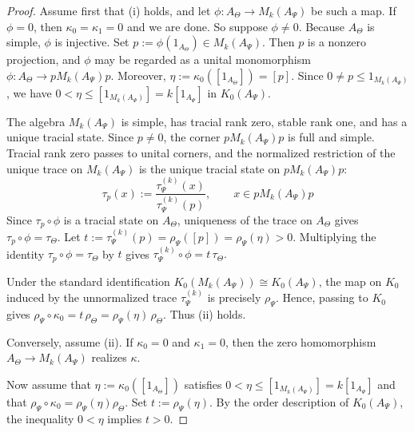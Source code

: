 \documentclass[11pt]{amsart}
\theoremstyle{definition}
\theoremstyle{remark}
\begin{document}
\begin{proof}
Assume first that \textup{(i)} holds, and let $\phi\colon A_{\Theta}\to M_k(A_{\Psi})$ be such a map.
If $\phi=0$, then $\kappa_0=\kappa_1=0$ and we are done. So suppose $\phi\neq 0$.
Because $A_{\Theta}$ is simple, $\phi$ is injective. Set $p:=\phi(1_{A_{\Theta}})\in M_k(A_{\Psi})$.
Then $p$ is a nonzero projection, and $\phi$ may be regarded as a unital monomorphism $\phi\colon A_{\Theta}\to pM_k(A_{\Psi})p.$
Moreover, $\eta:=\kappa_0([1_{A_\Theta}])=[p]$. Since $0\neq p\leq 1_{M_k(A_\Psi)}$, we have $0<\eta\leq [1_{M_k(A_\Psi)}]=k[1_{A_\Psi}]$
in $K_0(A_\Psi)$.

The algebra $M_k(A_\Psi)$ is simple, has tracial rank zero, stable rank one,
and has a unique tracial state. Since $p\neq 0$, the corner
$pM_k(A_\Psi)p$ is full and simple. Tracial rank zero passes to unital corners,
and the normalized restriction of the unique trace on $M_k(A_\Psi)$ is the
unique tracial state on $pM_k(A_\Psi)p$:
\[
\tau_p(x):=\frac{\tau_{\Psi}^{(k)}(x)}{\tau_{\Psi}^{(k)}(p)},\qquad x\in pM_k(A_{\Psi})p
\]
Since $\tau_p\circ\phi$ is a tracial state on $A_{\Theta}$, uniqueness of the trace on $A_{\Theta}$ gives $\tau_p\circ\phi = \tau_{\Theta}.$
Let $t:=\tau_\Psi^{(k)}(p)=\rho_\Psi([p])=\rho_\Psi(\eta)>0.$
Multiplying the identity $\tau_p\circ\phi=\tau_\Theta$ by $t$ gives  $\tau_{\Psi}^{(k)}\circ\phi = t\,\tau_{\Theta}.$

Under the standard identification $K_0(M_k(A_{\Psi}))\cong K_0(A_\Psi)$, the map on
$K_0$ induced by the unnormalized trace $\tau_\Psi^{(k)}$ is precisely
$\rho_\Psi$. Hence, passing to $K_0$ gives $\rho_\Psi\circ\kappa_0=t\,\rho_\Theta=\rho_\Psi(\eta)\,\rho_\Theta.$
Thus \textup{(ii)} holds.

Conversely, assume \textup{(ii)}. If $\kappa_0=0$ and $\kappa_1=0$, then the zero homomorphism $A_\Theta\to M_k(A_\Psi)$
realizes $\kappa$.

Now assume that $\eta:=\kappa_0([1_{A_\Theta}])$
satisfies $0<\eta\leq [1_{M_k(A_{\Psi})}] =k[1_{A_\Psi}]$
and that $\rho_\Psi\circ\kappa_0=\rho_\Psi(\eta)\rho_\Theta.$ Set $t:=\rho_\Psi(\eta).$
By the order description of $K_0(A_\Psi)$, the inequality $0<\eta$ implies $t>0$.


\end{proof}
\end{document}
